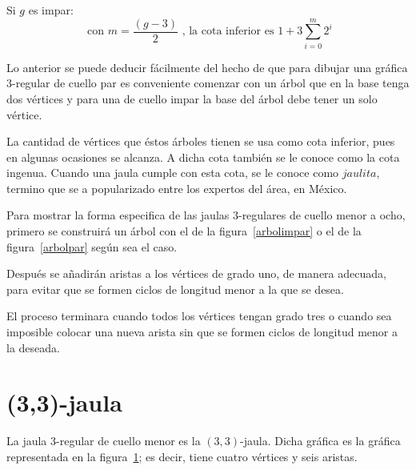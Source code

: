 \documentclass[12pt]{book}
\theoremstyle{definition}
\begin{document}
Si $g$ es impar:
\begin{equation*}
  \text{ con } m=\frac{(g-3)}{2} \text{ , la cota inferior es } 1 + 3\sum^m_{i=0} 2^i
\end{equation*}

Lo anterior se puede deducir fácilmente del hecho de que para dibujar
una gráfica 3-regular de cuello par es conveniente comenzar con un árbol que en
la base tenga dos vértices y para una de cuello impar la base del
árbol debe tener un solo vértice. 

La cantidad de vértices que éstos
árboles tienen se usa como cota inferior, pues en algunas ocasiones se alcanza.
A dicha cota también se le conoce como la cota ingenua. Cuando una jaula cumple con esta cota, se le conoce como
$jaulita$, termino que se a popularizado entre los
expertos del área, en México.


Para mostrar la forma especifica de las jaulas $3$-regulares de cuello
menor a ocho, primero se construirá un árbol con el de la
figura~\ref{arbolimpar} o el de la figura~\ref{arbolpar} según sea el
caso.
 
Después se añadirán aristas a los vértices de grado uno, de manera
adecuada, para evitar que se formen ciclos de longitud menor a la que
se desea. 

El proceso terminara cuando todos los vértices tengan grado
tres o cuando sea imposible colocar una nueva arista sin que se formen
ciclos de longitud menor a la deseada.


\section{(3,3)-jaula}

La jaula $3$-regular de cuello menor es la $(3,3)$-jaula. Dicha gráfica es la gráfica representada en la figura~\ref{jaula(3,3)}; es decir, tiene cuatro vértices y seis aristas.

\begin{figure}[htb]
  \centering
  \caption{} \label{jaula(3,3)}
\end{figure}
\end{document}
